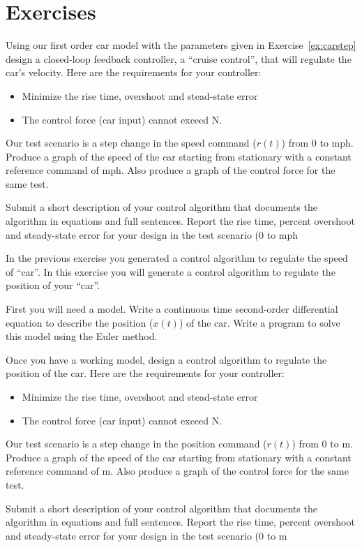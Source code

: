 \section{Exercises}
\begin{ex}
Using our first order car model with the parameters given in Exercise~\ref{ex:carstep} design a closed-loop feedback controller, a ``cruise control'', that will regulate the car's velocity.  Here are the requirements for your controller:
\begin{itemize}
\item Minimize the rise time, overshoot and stead-state error
\item The control force (car input) cannot exceed \unit[15,000]{N}.
\end{itemize}

Our test scenario is a step change in the speed command ($r(t)$) from 0 to \unit[60]{mph}. Produce a graph of the speed of the car starting from stationary with a constant reference command of \unit[60]{mph}.  Also produce a graph of the control force for the same test.

Submit a short description of your control algorithm that documents the algorithm in equations and full sentences.  Report the rise time, percent overshoot and steady-state error for your design in the test scenario (0 to \unit[60]{mph}
\end{ex}

\begin{ex}
In the previous exercise you generated a control algorithm to regulate the speed of ``car''.  In this exercise you will generate a control algorithm to regulate the position of your ``car''.

First you will need a model.  Write a continuous time second-order differential equation to describe the position ($x(t)$) of the car.  Write a program to solve this model using the Euler method.

Once you have a working model, design a control algorithm to regulate the position of the car.   Here are the requirements for your controller:
\begin{itemize}
\item Minimize the rise time, overshoot and stead-state error
\item The control force (car input) cannot exceed \unit[15,000]{N}.
\end{itemize}

Our test scenario is a step change in the position command ($r(t)$) from 0 to \unit[100]{m}. Produce a graph of the speed of the car starting from stationary with a constant reference command of \unit[100]{m}.  Also produce a graph of the control force for the same test.

Submit a short description of your control algorithm that documents the algorithm in equations and full sentences.  Report the rise time, percent overshoot and steady-state error for your design in the test scenario (0 to \unit[100]{m}
\end{ex}
